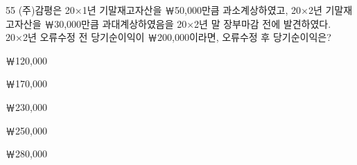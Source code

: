 \begin{question}{55}
(주)감평은 20×1년 기말재고자산을 ￦50,000만큼 과소계상하였고, 20×2년 기말재고자산을 ￦30,000만큼 과대계상하였음을 20×2년 말 장부마감 전에 발견하였다. 20×2년 오류수정 전 당기순이익이 ￦200,000이라면, 오류수정 후 당기순이익은?
\begin{choices}
  \item ￦120,000
  \item ￦170,000
  \item ￦230,000
  \item ￦250,000
  \item ￦280,000
\end{choices}
\end{question}
